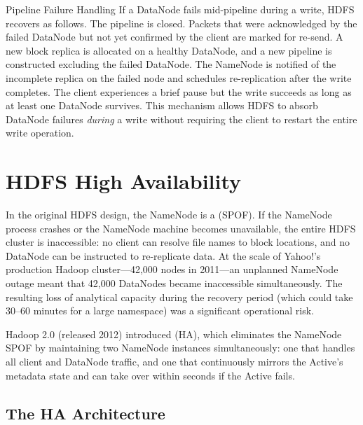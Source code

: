 \begin{systemdesign}{Pipeline Failure Handling}
If a DataNode fails mid-pipeline during a write, HDFS recovers as
follows. The pipeline is closed. Packets that were acknowledged by
the failed DataNode but not yet confirmed by the client are marked for
re-send. A new block replica is allocated on a healthy DataNode, and a
new pipeline is constructed excluding the failed DataNode. The NameNode
is notified of the incomplete replica on the failed node and schedules
re-replication after the write completes. The client experiences a
brief pause but the write succeeds as long as at least one DataNode
survives. This mechanism allows HDFS to absorb DataNode failures
\emph{during} a write without requiring the client to restart the
entire write operation.
\end{systemdesign}

\section{HDFS High Availability}
\label{sec:hdfs-ha}

In the original HDFS design, the NameNode is a  (SPOF). If the NameNode process crashes or the NameNode
machine becomes unavailable, the entire HDFS cluster is inaccessible:
no client can resolve file names to block locations, and no DataNode
can be instructed to re-replicate data. At the scale of Yahoo!'s
production Hadoop cluster---42,000 nodes in 2011---an unplanned
NameNode outage meant that 42,000 DataNodes became inaccessible
simultaneously. The resulting loss of analytical capacity during the
recovery period (which could take 30--60 minutes for a large
namespace) was a significant operational risk.

Hadoop 2.0 (released 2012) introduced 
(HA), which eliminates the NameNode SPOF by maintaining two NameNode
instances simultaneously: one  that handles all
client and DataNode traffic, and one  that
continuously mirrors the Active's metadata state and can take over
within seconds if the Active fails.

\subsection{The HA Architecture}
\label{subsec:ha-arch}

